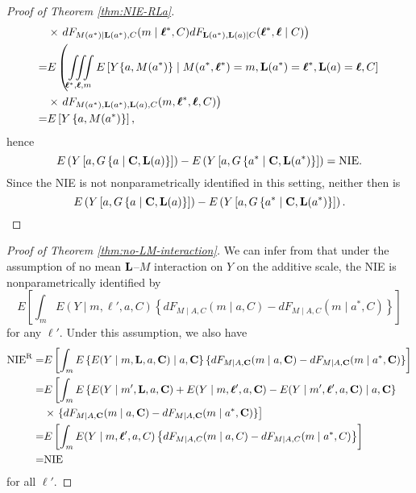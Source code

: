 \documentclass[12pt]{article}
\begin{document}
\begin{proof}[Proof of Theorem \ref{thm:NIE-RLa}]
\begin{align*}
        &\times \left.dF_{M(a^*)\mid {\bf L}(a^*),C}(m\mid {\boldsymbol \ell^*},C)dF_{{\bf L}(a^*),{\bf L}(a)\mid C}({\boldsymbol \ell^*},{\boldsymbol \ell}\mid C)\right)\\
        =& E\left(\iiint\limits_{{\boldsymbol \ell^*},{\boldsymbol \ell},m}E\left[Y\{a,M(a^*)\}\mid M(a^*,{\boldsymbol \ell^*})=m,{\bf L}(a^*)={\boldsymbol \ell^*}, {\bf L}(a)={\boldsymbol \ell}, C\right]\right.\\
        &\times \left.dF_{M(a^*), {\bf L}(a^*),{\bf L}(a),C}(m,{\boldsymbol \ell^*},{\boldsymbol \ell},C)\right)\\
        =& E\left[Y\left\{a,M(a^*)\right\}\right],
    \end{align*}
    hence
    \[E\left(Y\left[a,G\left\{a\mid {\bf C}, {\bf L}(a)\right\}\right]\right)-E\left(Y\left[a,G\left\{a^*\mid {\bf C}, {\bf L}(a^*)\right\}\right]\right)=\text{NIE}.\]
    Since the NIE is not nonparametrically identified in this setting, neither then is \[E\left(Y\left[a,G\left\{a\mid {\bf C}, {\bf L}(a)\right\}\right]\right)-E\left(Y\left[a,G\left\{a^*\mid {\bf C}, {\bf L}(a^*)\right\}\right]\right).\]
\end{proof}

\begin{proof}[Proof of Theorem \ref{thm:no-LM-interaction}]
    We can infer from \cite{tchetgen2014identification} that under the assumption of no mean ${\bf L}$--$M$ interaction on $Y$ on the additive scale, the NIE is nonparametrically identified by
    \[E\left[\int_m E(Y\mid m,{\boldsymbol \ell'},a,C)\left\{dF_{M\mid A,C}(m\mid a,C)-dF_{M\mid A,C}(m\mid a^*,C)\right\}\right]\]
    for any ${\boldsymbol \ell'}$. Under this assumption, we also have
    \begin{align*}
        \text{NIE}^{\text{R}} =& E\left[\int_m E\left\{E(Y\mid m,{\bf L},a,{\bf C})\mid a,{\bf C}\right\}\{dF_{M\mid A,{\bf C}}(m\mid a,{\bf C}) - dF_{M\mid A,{\bf C}}(m\mid a^*,{\bf C})\}\right]\\
        =& E\left[\int_m E\left\{E(Y\mid m',{\bf L},a,{\bf C}) + E(Y\mid m,{\boldsymbol \ell'},a,{\bf C}) - E(Y\mid m',{\boldsymbol \ell'},a,{\bf C})\mid a,{\bf C}\right\}\right.\\
        &\times\left.\{dF_{M\mid A,{\bf C}}(m\mid a,{\bf C}) - dF_{M\mid A,{\bf C}}(m\mid a^*,{\bf C})\}\right]\\
        =& E\left[\int_m E(Y\mid m,{\boldsymbol \ell'},a,C)\left\{dF_{M\mid A,C}(m\mid a,C)-dF_{M\mid A,C}(m\mid a^*,C)\right\}\right]\\
        =& \text{NIE}
    \end{align*}
    for all ${\boldsymbol \ell'}$.
\end{proof}
\end{document}
